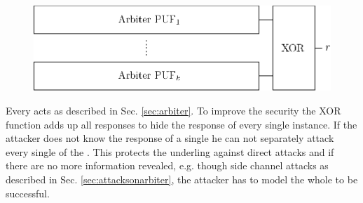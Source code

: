 \begin{figure}[ht]
\centering
\includegraphics[width=1.00\textwidth]{images/xor_arbiter.eps}
\caption[\acs{XOR} \apuf]{\xpuf}
\label{fig:xorarbiter}
\end{figure}

Every \apuf acts as described in Sec. \ref{sec:arbiter}. 
To improve the security the \ac{XOR} function adds up all responses to hide the response of every single \apuf instance.
If the attacker does not know the response of a single \apuf he can not separately attack every single \apuf of the \xpuf \cite{Becker2015ThePUFs}.
This protects the underling \apufs against direct attacks and if there are no more information revealed, e.g. though side channel attacks as described in Sec. \ref{sec:attacksonarbiter}, the attacker has to model the whole \xpuf to be successful.

